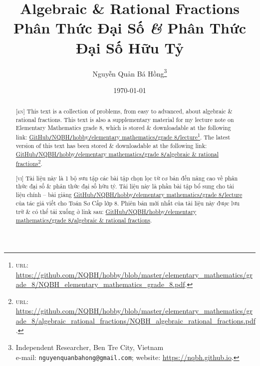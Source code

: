\documentclass{article}
\title{Algebraic \& Rational Fractions\\Phân Thức Đại Số \textit{\&} Phân Thức Đại Số Hữu Tỷ}
\author{Nguyễn Quản Bá Hồng\footnote{Independent Researcher, Ben Tre City, Vietnam\\e-mail: \texttt{nguyenquanbahong@gmail.com}; website: \url{https://nqbh.github.io}.}}
\date{\today}
\numberwithin{equation}{section}
\begin{document}
\maketitle
\begin{abstract}
	\textsc{[en]} This text is a collection of problems, from easy to advanced, about algebraic \& rational fractions. This text is also a supplementary material for my lecture note on Elementary Mathematics grade 8, which is stored \& downloadable at the following link: \href{https://github.com/NQBH/hobby/blob/master/elementary_mathematics/grade_8/NQBH_elementary_mathematics_grade_8.pdf}{GitHub\texttt{/}NQBH\texttt{/}hobby\texttt{/}elementary mathematics\texttt{/}grade 8\texttt{/}lecture}\footnote{\textsc{url}: \url{https://github.com/NQBH/hobby/blob/master/elementary_mathematics/grade_8/NQBH_elementary_mathematics_grade_8.pdf}.}. The latest version of this text has been stored \& downloadable at the following link: \href{https://github.com/NQBH/hobby/blob/master/elementary_mathematics/grade_8/algebraic_rational_fractions/NQBH_algebraic_rational_fractions.pdf}{GitHub\texttt{/}NQBH\texttt{/}hobby\texttt{/}elementary mathematics\texttt{/}grade 8\texttt{/}algebraic \& rational fractions}\footnote{\textsc{url}: \url{https://github.com/NQBH/hobby/blob/master/elementary_mathematics/grade_8/algebraic_rational_fractions/NQBH_algebraic_rational_fractions.pdf}.}.
	\vspace{2mm}
	
	\textsc{[vi]} Tài liệu này là 1 bộ sưu tập các bài tập chọn lọc từ cơ bản đến nâng cao về phân thức đại số \& phân thức đại số hữu tỷ. Tài liệu này là phần bài tập bổ sung cho tài liệu chính -- bài giảng \href{https://github.com/NQBH/hobby/blob/master/elementary_mathematics/grade_8/NQBH_elementary_mathematics_grade_8.pdf}{GitHub\texttt{/}NQBH\texttt{/}hobby\texttt{/}elementary mathematics\texttt{/}grade 8\texttt{/}lecture} của tác giả viết cho Toán Sơ Cấp lớp 8. Phiên bản mới nhất của tài liệu này được lưu trữ \& có thể tải xuống ở link sau: \href{https://github.com/NQBH/hobby/blob/master/elementary_mathematics/grade_8/algebraic_rational_fractions/NQBH_algebraic_rational_fractions.pdf}{GitHub\texttt{/}NQBH\texttt{/}hobby\texttt{/}elementary mathematics\texttt{/}grade 8\texttt{/}algebraic \& rational fractions}.
\end{abstract}
\setcounter{secnumdepth}{4}
\setcounter{tocdepth}{3}
\tableofcontents

\end{document}
